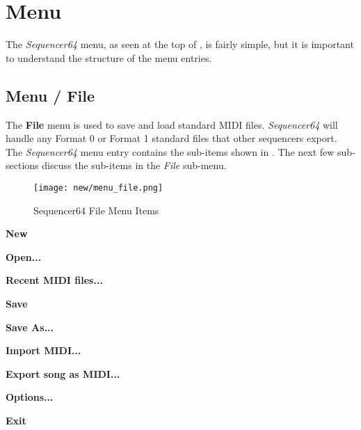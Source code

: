 %
%
%

\section{Menu}
\label{sec:seq64_menu}

   The \textsl{Sequencer64} menu, as seen at the top of
   , is fairly simple, but it is important to
   understand the structure of the menu entries.

\subsection{Menu / File}
\label{subsec:seq64_menu_file}

   The \textbf{File} menu is used to save and load standard MIDI files.
   \textsl{Sequencer64} will handle any Format 0 or
   Format 1 standard files that other sequencers export.
   The \textsl{Sequencer64} menu entry contains the sub-items shown in
   .  The next few sub-sections discuss
   the sub-items in the \textsl{File} sub-menu.

\begin{figure}[H]
   \centering 
   \texttt{[image: new/menu\_file.png]}
   \caption{Sequencer64 File Menu Items}
   \label{fig:seq64_menu_file_items}
\end{figure}

   \begin{enumber}
      \item \textbf{New}
      \item \textbf{Open...}
      \item \textbf{Recent MIDI files...}
      \item \textbf{Save}
      \item \textbf{Save As...}
      \item \textbf{Import MIDI...}
      \item \textbf{Export song as MIDI...}
      \item \textbf{Options...}
      \item \textbf{Exit}
   \end{enumber}

